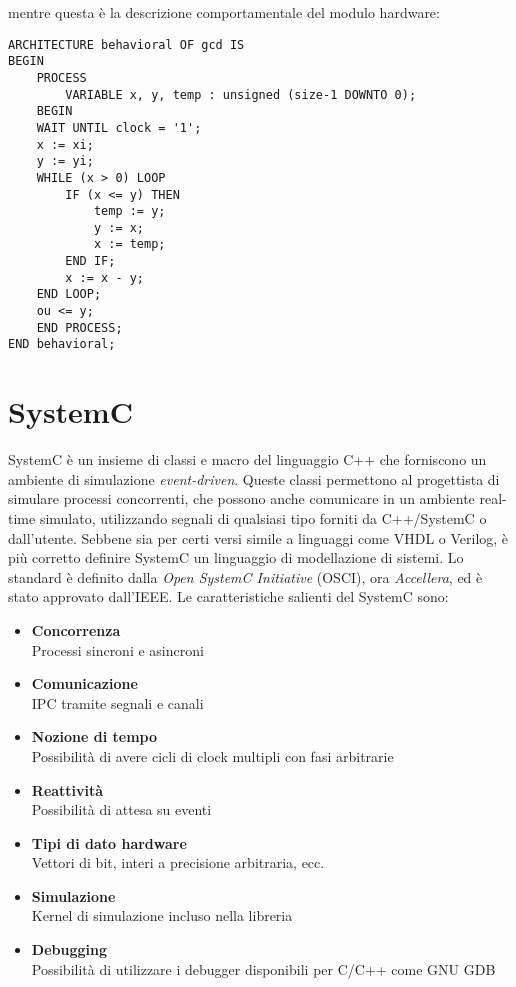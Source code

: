 \documentclass[10pt,a4paper,oneside]{scrbook}
\begin{document}
mentre questa è la descrizione comportamentale del modulo hardware:
\begin{verbatim}
ARCHITECTURE behavioral OF gcd IS
BEGIN
    PROCESS
        VARIABLE x, y, temp : unsigned (size-1 DOWNTO 0);
    BEGIN
    WAIT UNTIL clock = '1'; 
    x := xi;
    y := yi;
    WHILE (x > 0) LOOP
        IF (x <= y) THEN
            temp := y;
            y := x;
            x := temp;
        END IF;
        x := x - y;
    END LOOP;
    ou <= y;
    END PROCESS;
END behavioral;
\end{verbatim}

\chapter{SystemC}
SystemC è un insieme di classi e macro del linguaggio C++ che forniscono un ambiente di simulazione \textit{event-driven}.
Queste classi permettono al progettista di simulare processi concorrenti,  che possono anche comunicare in un ambiente
real-time simulato, utilizzando segnali di qualsiasi tipo forniti da C++/SystemC o dall'utente.
Sebbene sia per certi versi simile a linguaggi come VHDL o Verilog, è più corretto definire SystemC un linguaggio di
modellazione di sistemi.
Lo standard è definito dalla \textit{Open SystemC Initiative} (OSCI), ora \textit{Accellera}, ed è stato
approvato dall'IEEE. Le caratteristiche salienti del SystemC sono:
\begin{itemize}
    \item \textbf{Concorrenza}\\
    Processi sincroni e asincroni
    \item \textbf{Comunicazione}\\
    IPC tramite segnali e canali
    \item \textbf{Nozione di tempo}\\
    Possibilità di avere cicli di clock multipli con fasi arbitrarie
    \item \textbf{Reattività}\\
    Possibilità di attesa su eventi
    \item \textbf{Tipi di dato hardware}\\
    Vettori di bit, interi a precisione arbitraria, ecc.
    \item \textbf{Simulazione}\\
    Kernel di simulazione incluso nella libreria
    \item \textbf{Debugging}\\
    Possibilità di utilizzare i debugger disponibili per C/C++ come GNU GDB
\end{itemize}
\end{document}
